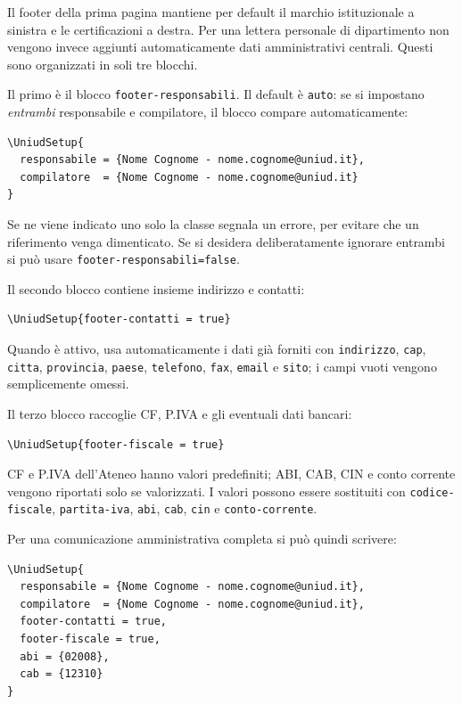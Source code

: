 \documentclass{uniudletter}
\begin{document}
\begin{letter}{}
Il footer della prima pagina mantiene per default il marchio istituzionale a
sinistra e le certificazioni a destra. Per una lettera personale di dipartimento
non vengono invece aggiunti automaticamente dati amministrativi centrali.
Questi sono organizzati in soli tre blocchi.

Il primo è il blocco \texttt{footer-responsabili}. Il default è
\texttt{auto}: se si impostano \emph{entrambi} responsabile e compilatore, il
blocco compare automaticamente:

\begin{lstlisting}
\UniudSetup{
  responsabile = {Nome Cognome - nome.cognome@uniud.it},
  compilatore  = {Nome Cognome - nome.cognome@uniud.it}
}
\end{lstlisting}

Se ne viene indicato uno solo la classe segnala un errore, per evitare che un
riferimento venga dimenticato. Se si desidera deliberatamente ignorare entrambi
si può usare \lstinline|footer-responsabili=false|.

Il secondo blocco contiene insieme indirizzo e contatti:

\begin{lstlisting}
\UniudSetup{footer-contatti = true}
\end{lstlisting}

Quando è attivo, usa automaticamente i dati già forniti con
\texttt{indirizzo}, \texttt{cap}, \texttt{citta}, \texttt{provincia},
\texttt{paese}, \texttt{telefono}, \texttt{fax}, \texttt{email} e
\texttt{sito}; i campi vuoti vengono semplicemente omessi.

Il terzo blocco raccoglie CF, P.IVA e gli eventuali dati bancari:

\begin{lstlisting}
\UniudSetup{footer-fiscale = true}
\end{lstlisting}

CF e P.IVA dell'Ateneo hanno valori predefiniti; ABI, CAB, CIN e conto corrente
vengono riportati solo se valorizzati. I valori possono essere sostituiti con
\texttt{codice-fiscale}, \texttt{partita-iva}, \texttt{abi}, \texttt{cab},
\texttt{cin} e \texttt{conto-corrente}.

Per una comunicazione amministrativa completa si può quindi scrivere:

\begin{lstlisting}
\UniudSetup{
  responsabile = {Nome Cognome - nome.cognome@uniud.it},
  compilatore  = {Nome Cognome - nome.cognome@uniud.it},
  footer-contatti = true,
  footer-fiscale = true,
  abi = {02008},
  cab = {12310}
}
\end{lstlisting}


\end{letter}
\end{document}

